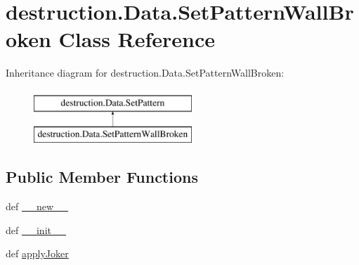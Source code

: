 \hypertarget{classdestruction_1_1_data_1_1_set_pattern_wall_broken}{\section{destruction.\-Data.\-Set\-Pattern\-Wall\-Broken Class Reference}
\label{classdestruction_1_1_data_1_1_set_pattern_wall_broken}
}
Inheritance diagram for destruction.\-Data.\-Set\-Pattern\-Wall\-Broken\-:\begin{figure}[H]
\begin{center}
\leavevmode
\includegraphics[height=2.000000cm]{classdestruction_1_1_data_1_1_set_pattern_wall_broken}
\end{center}
\end{figure}
\subsection*{Public Member Functions}
\begin{DoxyCompactItemize}
\item 
def \hyperlink{classdestruction_1_1_data_1_1_set_pattern_wall_broken_a490274734a0841127159e2e8e5d2f68b}{\-\_\-\-\_\-new\-\_\-\-\_\-}
\item 
def \hyperlink{classdestruction_1_1_data_1_1_set_pattern_wall_broken_a04ee557f78b8bef464d024550f67ea62}{\-\_\-\-\_\-init\-\_\-\-\_\-}
\item 
def \hyperlink{classdestruction_1_1_data_1_1_set_pattern_wall_broken_a42abfd983fa015ba35d55eb29d9b8143}{apply\-Joker}
\end{DoxyCompactItemize}
